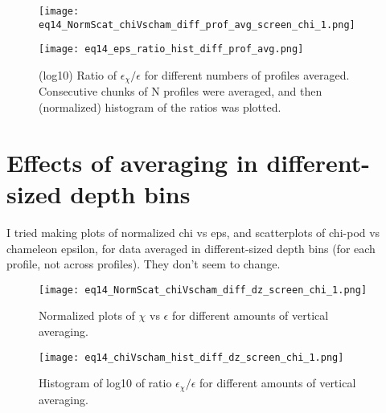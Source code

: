 \documentclass[11pt]{article}
\begin{document}
\begin{figure}[htbp]
\texttt{[image: eq14\_NormScat\_chiVscham\_diff\_prof\_avg\_screen\_chi\_1.png]}
\caption{}
\label{}
\end{figure}

\begin{figure}[htbp]
\texttt{[image: eq14\_eps\_ratio\_hist\_diff\_prof\_avg.png]}
\caption{(log10) Ratio of $\epsilon_{\chi}/\epsilon$ for different numbers of profiles averaged. Consecutive chunks of N profiles were averaged, and then (normalized) histogram of the ratios was plotted.}
\label{}
\end{figure}




\clearpage
\section{Effects of averaging in different-sized depth bins}

I tried making plots of normalized chi vs eps, and scatterplots of chi-pod vs chameleon epsilon, for data averaged in different-sized depth bins (for each profile, not across profiles). They don't seem to change.

\begin{figure}[htbp]
\texttt{[image: eq14\_NormScat\_chiVscham\_diff\_dz\_screen\_chi\_1.png]}
\caption{Normalized plots of $\chi$ vs $\epsilon$ for different amounts of vertical averaging.}
\label{}
\end{figure}


\begin{figure}[htbp]
\texttt{[image: eq14\_chiVscham\_hist\_diff\_dz\_screen\_chi\_1.png]}
\caption{Histogram of log10 of ratio $\epsilon_{\chi}/\epsilon$ for different amounts of vertical averaging.}
\label{}
\end{figure}



%







\clearpage
\end{document}
